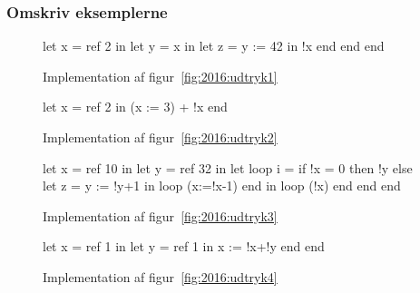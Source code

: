 \subsubsection{Omskriv eksemplerne}
\begin{figure}[!ht]
    \begin{FSharp}
let x = ref 2 in
  let y = x in
    let z = y := 42 in
      !x
    end
  end
end
    \end{FSharp}
    \caption{Implementation af figur~\ref{fig:2016:udtryk1}}\label{fig:2016:imp1}
\end{figure}
\begin{figure}[!ht]
\begin{FSharp}
let x = ref 2 in 
    (x := 3) + !x 
end
\end{FSharp}
    \caption{Implementation af figur~\ref{fig:2016:udtryk2}}\label{fig:2016:imp2}
\end{figure}
\begin{figure}[!ht]
\begin{FSharp}
let x = ref 10 in 
  let y = ref 32 in
    let loop i =  
        if !x = 0 then !y
        else 
          let z = y := !y+1 in
            loop (x:=!x-1)
          end
      in loop (!x)
    end
  end
end
\end{FSharp}
    \caption{Implementation af figur~\ref{fig:2016:udtryk3}}\label{fig:2016:imp2}
\end{figure}
\begin{figure}[!ht]
\begin{FSharp}
let x = ref 1 in 
  let y = ref 1 in
    x := !x+!y
  end
end
\end{FSharp}
    \caption{Implementation af figur~\ref{fig:2016:udtryk4}}\label{fig:2016:imp2}
\end{figure}
\newpage
